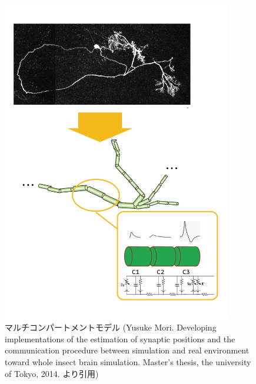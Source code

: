 \begin{figure}[htb]
 \begin{center}
    \includegraphics[width=10cm]{./images/multi-compartment.pdf}
    \caption[マルチコンパートメントモデル]{マルチコンパートメントモデル (Yusuke Mori. Developing implementations of the estimation of synaptic positions and the communication procedure between simulation and real environment toward whole insect brain simulation. Master's thesis, the university of Tokyo, 2014\cite{mori-master}. より引用)}
    \label{fig:multi-compartment}
 \end{center}
\end{figure}
\clearpage
